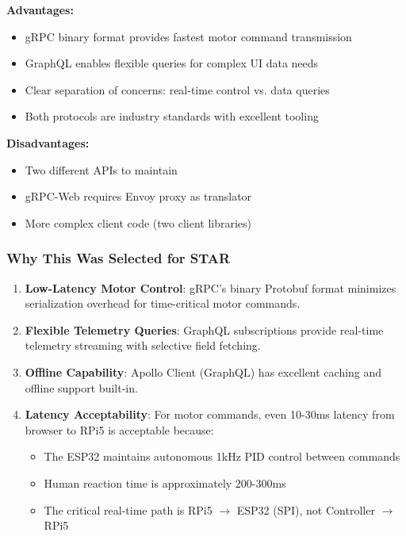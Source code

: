 \textbf{Advantages:}
\begin{itemize}
    \item gRPC binary format provides fastest motor command transmission
    \item GraphQL enables flexible queries for complex UI data needs
    \item Clear separation of concerns: real-time control vs. data queries
    \item Both protocols are industry standards with excellent tooling
\end{itemize}

\textbf{Disadvantages:}
\begin{itemize}
    \item Two different APIs to maintain
    \item gRPC-Web requires Envoy proxy as translator
    \item More complex client code (two client libraries)
\end{itemize}

\subsubsection{Why This Was Selected for STAR}

\begin{enumerate}
    \item \textbf{Low-Latency Motor Control}: gRPC's binary Protobuf format minimizes serialization overhead for time-critical motor commands.

    \item \textbf{Flexible Telemetry Queries}: GraphQL subscriptions provide real-time telemetry streaming with selective field fetching.

    \item \textbf{Offline Capability}: Apollo Client (GraphQL) has excellent caching and offline support built-in.

    \item \textbf{Latency Acceptability}: For motor commands, even 10-30ms latency from browser to RPi5 is acceptable because:
    \begin{itemize}
        \item The ESP32 maintains autonomous 1kHz PID control between commands
        \item Human reaction time is approximately 200-300ms
        \item The critical real-time path is RPi5 $\rightarrow$ ESP32 (SPI), not Controller $\rightarrow$ RPi5
    \end{itemize}
\end{enumerate}

